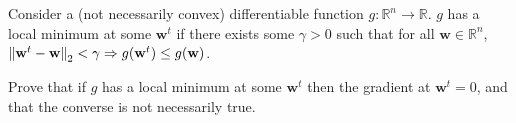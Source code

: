 
Consider a (not necessarily convex) differentiable function $g : \mathbb{R}^{n} \rightarrow \mathbb{R}$. $g$ has a local minimum at some $\mathbf{w}^{t}$ if there exists some $\gamma > 0$ such that for all $\mathbf{w} \in \mathbb{R}^{n}$, $\left| \hspace{-0.7pt}\left|\mathbf{w}^{t} - \mathbf{w}\right| \hspace{-0.7pt}\right|_{2} < \gamma \Rightarrow g(\mathbf{w}^{t}) \leq g(\mathbf{w})$.

Prove that if $g$ has a local minimum at some $\mathbf{w}^{t}$ then the gradient at $\mathbf{w}^{t} = 0$, and that the converse
is not necessarily true.
